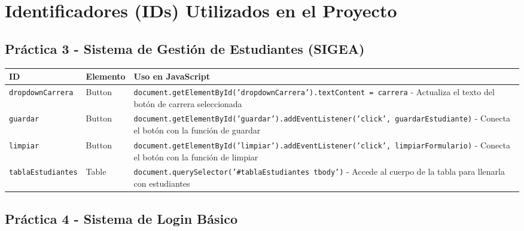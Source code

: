 \documentclass[12pt,a4paper]{article}
\begin{document}
\newpage

\section{Identificadores (IDs) Utilizados en el Proyecto}

\subsection{Práctica 3 - Sistema de Gestión de Estudiantes (SIGEA)}

\begin{longtable}{|p{4cm}|p{3cm}|p{8cm}|}
\hline
\rowcolor{lightgray}
\textbf{ID} & \textbf{Elemento} & \textbf{Uso en JavaScript} \\
\hline

\texttt{dropdownCarrera} & Button & \texttt{document.getElementById('dropdownCarrera').textContent = carrera} - Actualiza el texto del botón de carrera seleccionada \\
\hline

\texttt{guardar} & Button & \texttt{document.getElementById('guardar').addEventListener('click', guardarEstudiante)} - Conecta el botón con la función de guardar \\
\hline

\texttt{limpiar} & Button & \texttt{document.getElementById('limpiar').addEventListener('click', limpiarFormulario)} - Conecta el botón con la función de limpiar \\
\hline

\texttt{tablaEstudiantes} & Table & \texttt{document.querySelector('\#tablaEstudiantes tbody')} - Accede al cuerpo de la tabla para llenarla con estudiantes \\
\hline

\end{longtable}

\subsection{Práctica 4 - Sistema de Login Básico}
\end{document}
